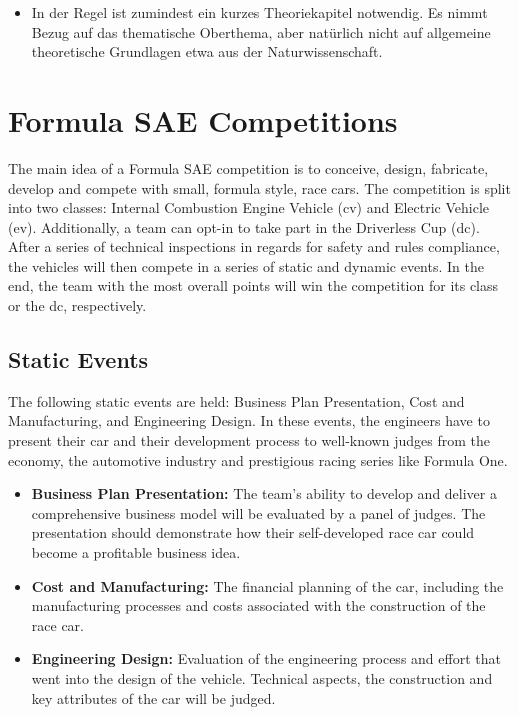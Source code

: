 \begin{itemize}
    \item In der Regel ist zumindest ein kurzes Theoriekapitel notwendig. Es nimmt Bezug auf das thematische Oberthema, aber natürlich nicht auf allgemeine theoretische Grundlagen etwa aus der Naturwissenschaft.
\end{itemize}

\section{Formula SAE Competitions}
The main idea of a Formula SAE competition is to conceive, design, fabricate, develop and compete with small, formula style, race cars.
The competition is split into two classes: Internal Combustion Engine Vehicle (\acrshort{cv}) and Electric Vehicle (\acrshort{ev}).
Additionally, a team can opt-in to take part in the Driverless Cup (\acrshort{dc}).
After a series of technical inspections in regards for safety and rules compliance, the vehicles will then compete in a series of static and dynamic events. In the end, the team with the most overall points will win the competition for its class or the \acrlong{dc}, respectively.

\subsection{Static Events}
The following static events are held: Business Plan Presentation, Cost and Manufacturing, and Engineering Design. In these events, the engineers have to present their car and their development process to well-known judges from the economy, the automotive industry and prestigious racing series like Formula One.

\begin{itemize}
    \item \textbf{Business Plan Presentation:} The team's ability to develop and deliver a comprehensive business model will be evaluated by a panel of judges. The presentation should demonstrate how their self-developed race car could become a profitable business idea.
    \item \textbf{Cost and Manufacturing:} The financial planning of the car, including the manufacturing processes and costs associated with the construction of the race car.
    \item \textbf{Engineering Design:} Evaluation of the engineering process and effort that went into the design of the vehicle. Technical aspects, the construction and key attributes of the car will be judged.
\end{itemize}


